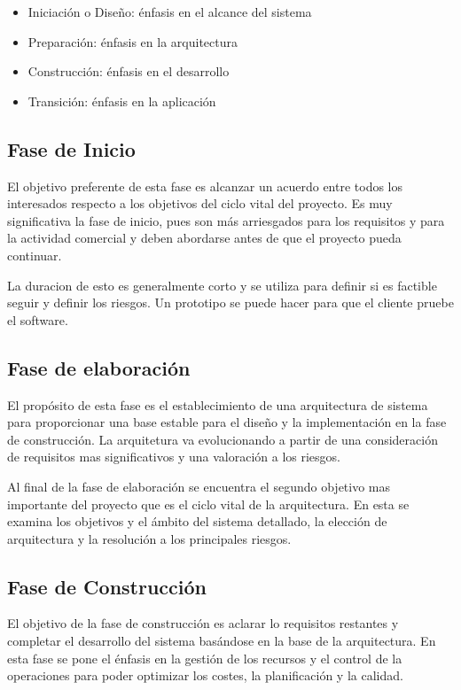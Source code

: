 \documentclass[spanish]{udpreport}
\begin{document}
\begin{itemize}
\item Iniciación o Diseño: énfasis en el alcance del sistema
\item Preparación: énfasis en la arquitectura
\item Construcción: énfasis en el desarrollo
\item Transición: énfasis en la aplicación

\end{itemize}

\subsection{Fase de Inicio}
\label{subsec:inicio}
El objetivo preferente de esta fase es alcanzar un acuerdo entre todos los interesados respecto a los objetivos del ciclo vital del proyecto.
Es muy significativa la fase de inicio, pues son más arriesgados para los requisitos y para la actividad comercial y deben abordarse antes de que el proyecto pueda continuar.\par
La duracion de esto es generalmente corto y se utiliza para definir si es factible seguir y definir los riesgos. Un prototipo se puede hacer para que el cliente pruebe el software.\par


\subsection{Fase de elaboración}
\label{subsec:elaboracion}
El propósito de esta fase es el establecimiento de una arquitectura de sistema para proporcionar una base estable para el diseño y la implementación en la fase de construcción. La arquitetura va evolucionando  a partir de una consideración de requisitos mas significativos y  una valoración a los riesgos.\par
Al final de la fase de elaboración se encuentra el segundo objetivo mas importante del proyecto que es el ciclo vital de la arquitectura. En esta se examina los objetivos y el ámbito del sistema detallado, la elección de arquitectura y la resolución a los principales riesgos.

\subsection{Fase de Construcción}
\label{subsec:construccion}
El objetivo de la fase de construcción es aclarar lo requisitos restantes y completar el desarrollo del sistema basándose en la base de la arquitectura.
En esta fase se pone el énfasis en la gestión de los recursos y el control de la operaciones para poder optimizar los costes, la planificación y la calidad.\par
\end{document}
